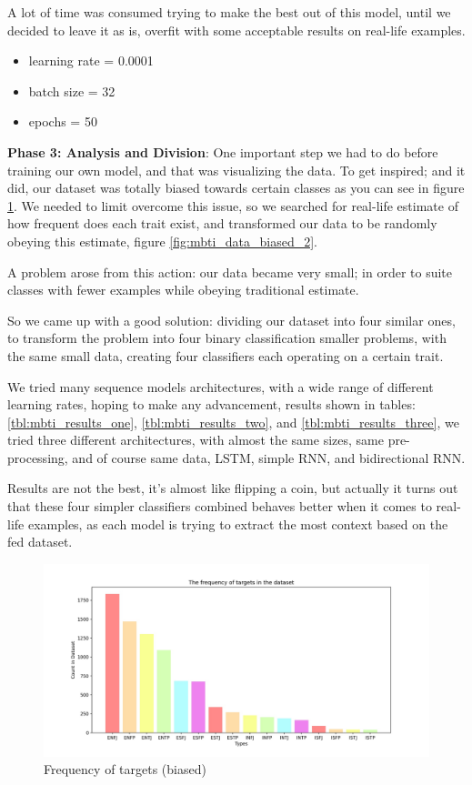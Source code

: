 A lot of time was consumed trying to make the best out of this model, until we decided to leave it as is, overfit with some acceptable results on real-life examples.\\

\begin{itemize}
    \item learning rate = 0.0001
    \item batch size = 32
    \item epochs = 50\\
\end{itemize}

\textbf{Phase 3: Analysis and Division}: One important step we had to do before training our own model, and that was visualizing the data. To get inspired; and it did, our dataset was totally biased towards certain classes as you can see in figure \ref{fig:mbti_data_biased}. We needed to limit overcome this issue, so we searched for real-life estimate of how frequent does each trait exist, and transformed our data to be randomly obeying this estimate, figure \ref{fig:mbti_data_biased_2}.


A problem arose from this action: our data became very small; in order to suite classes with fewer examples while obeying traditional estimate. 

So we came up with a good solution: dividing our dataset into four similar ones, to transform the problem into four binary classification smaller problems, with the same small data, creating four classifiers each operating on a certain trait.

We tried many sequence models architectures, with a wide range of different learning rates, hoping to make any advancement, results shown in tables: \ref{tbl:mbti_results_one}, \ref{tbl:mbti_results_two}, and \ref{tbl:mbti_results_three}, we tried three different architectures, with almost the same sizes, same pre-processing, and of course same data, LSTM, simple RNN, and bidirectional RNN.

Results are not the best, it's almost like flipping a coin, but actually it turns out that these four simpler classifiers combined behaves better when it comes to real-life examples, as each model is trying to extract the most context based on the fed dataset.\\

\begin{figure}[h!]
\centering
\includegraphics[width=1\textwidth]{images/freq_of_targets.jpg}
\caption{Frequency of targets (biased)}
\label{fig:mbti_data_biased}
\end{figure}

